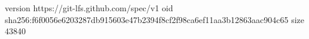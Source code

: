 version https://git-lfs.github.com/spec/v1
oid sha256:f6f0056e6203287db915603e47b2394f8cf2f98ca6ef11aa3b12863aac904c65
size 43840
